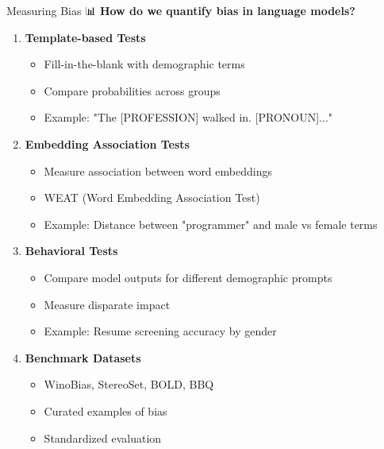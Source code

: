 \documentclass[aspectratio=169]{beamer}
\begin{document}
\begin{frame}[shrink=10]{Measuring Bias 📊}
\textbf{How do we quantify bias in language models?}

\vspace{0.5em}

\begin{enumerate}\setlength{\itemsep}{0pt}
    \item \textbf{Template-based Tests}
    \begin{itemize}\setlength{\itemsep}{0pt}
        \item Fill-in-the-blank with demographic terms
        \item Compare probabilities across groups
        \item Example: "The [PROFESSION] walked in. [PRONOUN]..."
    \end{itemize}

    \item \textbf{Embedding Association Tests}
    \begin{itemize}\setlength{\itemsep}{0pt}
        \item Measure association between word embeddings
        \item WEAT (Word Embedding Association Test)
        \item Example: Distance between "programmer" and male vs female terms
    \end{itemize}

    \item \textbf{Behavioral Tests}
    \begin{itemize}\setlength{\itemsep}{0pt}
        \item Compare model outputs for different demographic prompts
        \item Measure disparate impact
        \item Example: Resume screening accuracy by gender
    \end{itemize}

    \item \textbf{Benchmark Datasets}
    \begin{itemize}\setlength{\itemsep}{0pt}
        \item WinoBias, StereoSet, BOLD, BBQ
        \item Curated examples of bias
        \item Standardized evaluation
    \end{itemize}
\end{enumerate}
\end{frame}
\end{document}
